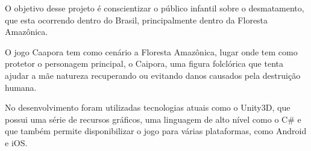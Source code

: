 O objetivo desse projeto é conscientizar o público infantil sobre o desmatamento, que esta ocorrendo dentro do Brasil, principalmente dentro da Floresta Amazônica.

O jogo Caapora tem como cenário a Floresta Amazônica, lugar onde tem como protetor o personagem principal, o Caipora, uma figura folclórica que tenta ajudar a mãe natureza recuperando ou evitando danos causados pela destruição humana.

No desenvolvimento foram utilizadas tecnologias atuais como o Unity3D, que possui uma série de recursos gráficos, uma linguagem de alto nível como o C\# e que também permite disponibilizar o jogo para várias plataformas, como Android e iOS.


